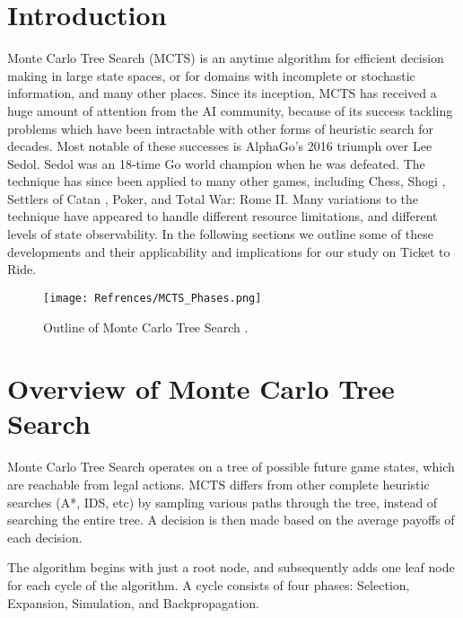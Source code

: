 \documentclass[12pt, letterpaper, twoside]{article}
\begin{document}
\maketitle

\section{Introduction}

Monte Carlo Tree Search (MCTS) is an anytime algorithm for efficient decision making in large state spaces, or for domains with incomplete or stochastic information, and many other places. Since its inception, MCTS has received a huge amount of attention from the AI community, because of its success tackling problems which have been intractable with other forms of heuristic search for decades. Most notable of these successes is AlphaGo's \cite{alphago} 2016 triumph over Lee Sedol. Sedol was an 18-time Go world champion when he was defeated. The technique has since been applied to many other games, including Chess, Shogi \cite{journals/corr/abs-1712-01815}, Settlers of Catan \cite{10.1007/978-3-642-12993-3_3}, Poker, and Total War: Rome II. Many variations to the technique have appeared to handle different resource limitations, and different levels of state observability. In the following sections we outline some of these developments and their applicability and implications for our study on Ticket to Ride.

\begin{figure}
  \texttt{[image: Refrences/MCTS\_Phases.png]}
  \caption{Outline of Monte Carlo Tree Search \cite{mcts_survey}.}
  \label{fig:mcts_outline}
\end{figure}

\section{Overview of Monte Carlo Tree Search}

Monte Carlo Tree Search operates on a tree of possible future game states, which are reachable from legal actions. MCTS differs from other complete heuristic searches (A*, IDS, etc) by sampling various paths through the tree, instead of searching the entire tree. A decision is then made based on the average payoffs of each decision.
 
The algorithm \cite{mcts_inaugural} begins with just a root node, and subsequently adds one leaf node for each cycle of the algorithm. A cycle consists of four phases: Selection, Expansion, Simulation, and Backpropagation.
\end{document}

